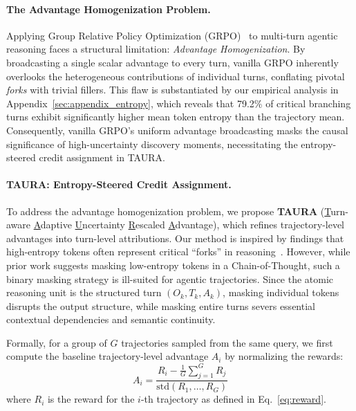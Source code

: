 \documentclass{article}
\theoremstyle{plain}
\theoremstyle{definition}
\theoremstyle{remark}
\begin{document}
\paragraph{The Advantage Homogenization Problem.}
Applying Group Relative Policy Optimization (GRPO)~\cite{guo2025deepseek} to multi-turn agentic reasoning faces a structural limitation: \textit{Advantage Homogenization}. 
By broadcasting a single scalar advantage to every turn, vanilla GRPO
inherently overlooks the heterogeneous contributions of individual
turns, conflating pivotal \textit{forks} with trivial fillers. This flaw
is substantiated by our empirical analysis in
Appendix~\ref{sec:appendix_entropy}, which reveals that 79.2\% of
critical branching turns exhibit significantly higher mean token entropy
than the trajectory mean. Consequently, vanilla GRPO's uniform advantage
broadcasting masks the causal significance of high-uncertainty discovery
moments, necessitating the entropy-steered credit assignment in TAURA.


\paragraph{TAURA: Entropy-Steered Credit Assignment.} 
To address the advantage homogenization problem, we propose \textbf{TAURA} (\underline{T}urn-aware \underline{A}daptive \underline{U}ncertainty \underline{R}escaled \underline{A}dvantage), which refines trajectory-level advantages into turn-level attributions. Our method is inspired by findings that high-entropy tokens often represent critical ``forks'' in reasoning~\cite{wang2025beyond}. However, while prior work suggests masking low-entropy tokens in a Chain-of-Thought, such a binary masking strategy is ill-suited for agentic trajectories. Since the atomic reasoning unit is the structured turn $(O_k, T_k, A_k)$, masking individual tokens disrupts the output structure, while masking entire turns severs essential contextual dependencies and semantic continuity.

Formally, for a group of $G$ trajectories sampled from the same query, we first compute the baseline trajectory-level advantage $A_i$ by normalizing the rewards:
\begin{equation}
    A_i = \frac{R_i - \frac{1}{G} \sum_{j=1}^G R_j}{\text{std}(R_1, \dots, R_G)}
\end{equation}
where $R_i$ is the reward for the $i$-th trajectory as defined in Eq.~\ref{eq:reward}.  
\end{document}

